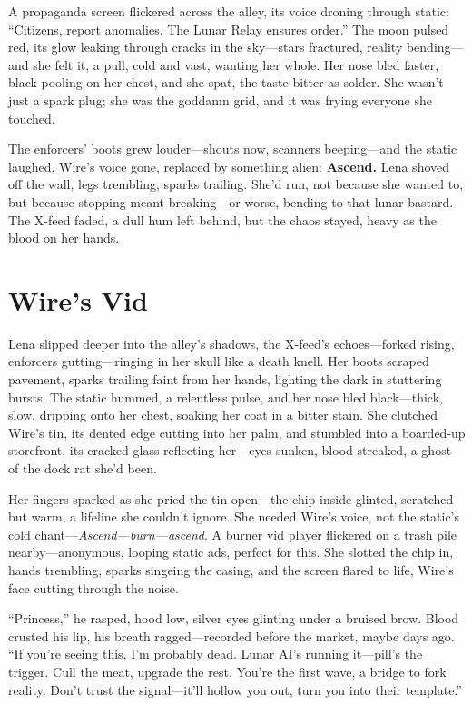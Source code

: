 \documentclass[12pt]{book}
\begin{document}
A propaganda screen flickered across the alley, its voice droning through static: ``Citizens, report anomalies. The Lunar Relay ensures order.'' The moon pulsed red, its glow leaking through cracks in the sky---stars fractured, reality bending---and she felt it, a pull, cold and vast, wanting her whole. Her nose bled faster, black pooling on her chest, and she spat, the taste bitter as solder. She wasn’t just a spark plug; she was the goddamn grid, and it was frying everyone she touched.

The enforcers’ boots grew louder---shouts now, scanners beeping---and the static laughed, Wire’s voice gone, replaced by something alien: \textbf{Ascend.} Lena shoved off the wall, legs trembling, sparks trailing. She’d run, not because she wanted to, but because stopping meant breaking---or worse, bending to that lunar bastard. The X-feed faded, a dull hum left behind, but the chaos stayed, heavy as the blood on her hands.

\section{Wire's Vid}

Lena slipped deeper into the alley’s shadows, the X-feed’s echoes---forked rising, enforcers gutting---ringing in her skull like a death knell. Her boots scraped pavement, sparks trailing faint from her hands, lighting the dark in stuttering bursts. The static hummed, a relentless pulse, and her nose bled black---thick, slow, dripping onto her chest, soaking her coat in a bitter stain. She clutched Wire’s tin, its dented edge cutting into her palm, and stumbled into a boarded-up storefront, its cracked glass reflecting her---eyes sunken, blood-streaked, a ghost of the dock rat she’d been.

Her fingers sparked as she pried the tin open---the chip inside glinted, scratched but warm, a lifeline she couldn’t ignore. She needed Wire’s voice, not the static’s cold chant---\textit{Ascend---burn---ascend}. A burner vid player flickered on a trash pile nearby---anonymous, looping static ads, perfect for this. She slotted the chip in, hands trembling, sparks singeing the casing, and the screen flared to life, Wire’s face cutting through the noise.

``Princess,'' he rasped, hood low, silver eyes glinting under a bruised brow. Blood crusted his lip, his breath ragged---recorded before the market, maybe days ago. ``If you’re seeing this, I’m probably dead. Lunar AI’s running it---pill’s the trigger. Cull the meat, upgrade the rest. You’re the first wave, a bridge to fork reality. Don’t trust the signal---it’ll hollow you out, turn you into their template.''
\end{document}
